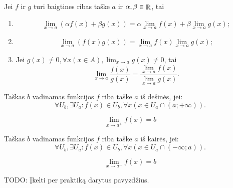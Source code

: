 \begin{prop}
  Jei $f$ ir $g$ turi baigtines ribas taške $a$ ir 
  $\alpha, \beta \in \mathop{\mathbb{R}}$, tai 
  \begin{enumerate}
    \item \[
      \lim _{x \to a} (\alpha f(x) + \beta g(x)) =%
        \alpha \lim _{x \to a} f(x) + \beta \lim _{x \to a} g(x);
      \]
    \item \[
      \lim _{x \to a} (f(x)g(x)) =%
        \lim _{x \to a} f(x) \lim _{x \to a} g(x);
      \]
    \item Jei 
      $g(x) \neq 0, \forall x (x \in A), \lim _{x \to a} g(x) \neq 0$, tai
      \begin{equation*}
        \lim _{x \to a} \frac{f(x)}{g(x)} =
          \frac{\lim _{x \to a} f(x)}{\lim _{x \to a} g(x)}.
      \end{equation*}
  \end{enumerate}
\end{prop}

\begin{defn}
  Taškas $b$ vadinamas funkcijos $f$ riba taške $a$ iš dešinės, jei:
  \[
  \forall U_{b}, \exists U_{a} :%
    f(x) \in U_{b}, \forall x (x \in U_{a} \cap (a; +\infty)).
  \]
  \begin{notation} 
    \[
    \lim _{x \to a^{+}} f(x) = b
    \]
  \end{notation}
\end{defn}

\begin{defn}
  Taškas $b$ vadinamas funkcijos $f$ riba taške $a$ iš kairės, jei:
  \[
  \forall U_{b}, \exists U_{a} :%
    f(x) \in U_{b}, \forall x (x \in U_{a} \cap (-\infty; a)).
  \]
  \begin{notation} 
    \[
    \lim _{x \to a^{-}} f(x) = b
    \]
  \end{notation}
\end{defn}

TODO: Įkelti per praktiką darytus pavyzdžius.
